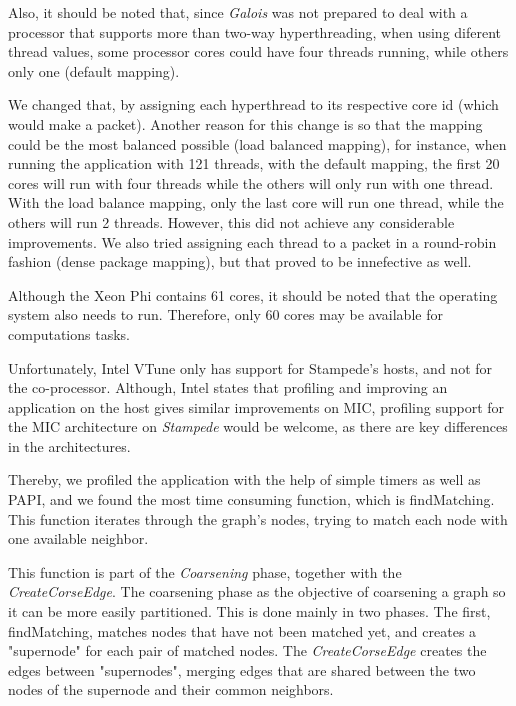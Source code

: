 \documentclass[abstract=on,9pt,twocolumn]{scrartcl}
\begin{document}
Also, it should be noted that, since \textit{Galois} was not prepared to deal with a processor that supports more than two-way hyperthreading, when using diferent thread values, some processor cores could have four threads running, while others only one (default mapping).

We changed that, by assigning each hyperthread to its respective core id (which would make a packet).
Another reason for this change is so that the mapping could be
the most balanced possible (load balanced mapping), for instance,
when running the application with 121 threads, with the default mapping,
the first 20 cores will run with four threads while the others will only
run with one thread. With the load balance mapping, only the last core
will run one thread, while the others will run 2 threads. However, this did not achieve any considerable improvements. We also tried assigning each thread to a packet in a round-robin fashion (dense package mapping), but that proved to be innefective as well.

Although the Xeon Phi contains 61 cores, it should be noted that the
operating system also needs to run. Therefore, only 60 cores may be
available for computations tasks.



Unfortunately, Intel VTune only has support for Stampede's hosts, and
not for the co-processor. Although, Intel states that profiling and
improving an application on the host gives similar improvements on MIC,
profiling support for the MIC architecture on \textit{Stampede} would be
welcome, as there are key differences in the architectures.

Thereby, we profiled the application with the help of simple timers as
well as PAPI, and we found the most time consuming function, which is
findMatching. This function iterates through the graph's nodes, trying
to match each node with one available neighbor.

This function is part of the \textit{Coarsening} phase, together with
the \textit{CreateCorseEdge}.
The coarsening phase as the objective of coarsening a graph so it can be
more easily partitioned. This is done mainly in two phases. The first,
findMatching, matches nodes that have not been matched yet, and creates
a "supernode" for each pair of matched nodes. The
\textit{CreateCorseEdge} creates the edges between "supernodes", merging
edges that are shared between the two nodes of the supernode and their
common neighbors.
\end{document}
